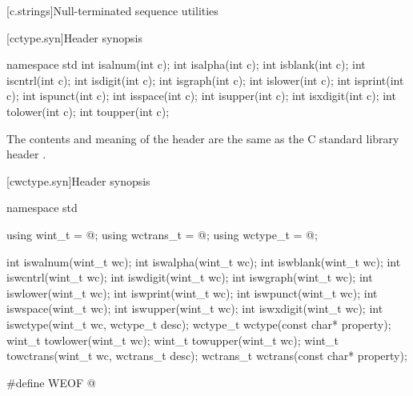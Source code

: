 [c.strings]{Null-terminated sequence utilities}

[cctype.syn]{Header  synopsis}

%
%
%
%
%
%
%
%
%
%
%
%
%
%
%
\begin{codeblock}
namespace std {
  int isalnum(int c);
  int isalpha(int c);
  int isblank(int c);
  int iscntrl(int c);
  int isdigit(int c);
  int isgraph(int c);
  int islower(int c);
  int isprint(int c);
  int ispunct(int c);
  int isspace(int c);
  int isupper(int c);
  int isxdigit(int c);
  int tolower(int c);
  int toupper(int c);
}
\end{codeblock}

\pnum
{}%
The contents and meaning of the header 
are the same as the C standard library header .


[cwctype.syn]{Header  synopsis}

%
%
%
%
%
%
%
%
%
%
%
%
%
%
%
%
%
%
%
%
%
%
%
\begin{codeblock}
namespace std {
  using wint_t = @\seebelow@;
  using wctrans_t = @\seebelow@;
  using wctype_t = @\seebelow@;

  int iswalnum(wint_t wc);
  int iswalpha(wint_t wc);
  int iswblank(wint_t wc);
  int iswcntrl(wint_t wc);
  int iswdigit(wint_t wc);
  int iswgraph(wint_t wc);
  int iswlower(wint_t wc);
  int iswprint(wint_t wc);
  int iswpunct(wint_t wc);
  int iswspace(wint_t wc);
  int iswupper(wint_t wc);
  int iswxdigit(wint_t wc);
  int iswctype(wint_t wc, wctype_t desc);
  wctype_t wctype(const char* property);
  wint_t towlower(wint_t wc);
  wint_t towupper(wint_t wc);
  wint_t towctrans(wint_t wc, wctrans_t desc);
  wctrans_t wctrans(const char* property);
}

#define WEOF @\seebelow@
\end{codeblock}


